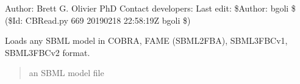 \documentclass[letterpaper,12pt,english]{sphinxmanual}
\begin{document}
\sphinxAtStartPar
Author: Brett G. Olivier PhD
Contact developers: 
Last edit: \$Author: bgoli \$ (\$Id: CBRead.py 669 2019\sphinxhyphen{}02\sphinxhyphen{}18 22:58:19Z bgoli \$)


\begin{fulllineitems}

\pysigstartsignatures
\pysiglinewithargsret
{}
{}
{}
\pysigstopsignatures
\sphinxAtStartPar
Loads any SBML model in COBRA, FAME (SBML2FBA), SBML3FBCv1, SBML3FBCv2 format.
\begin{quote}\begin{description}
\sphinxAtStartPar
{} \textendash{} an SBML model file

\end{description}\end{quote}

\end{fulllineitems}
\end{document}
